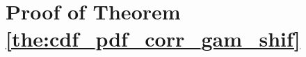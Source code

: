 \documentclass[12pt,onecolumn,draftcls]{IEEEtran}
\newtheorem{mydef}{Definition}
\begin{document}
\section{Proof of Theorem \ref{the:cdf_pdf_corr_gam_shif}} \label{app:fox_H_fun}
\end{document}
